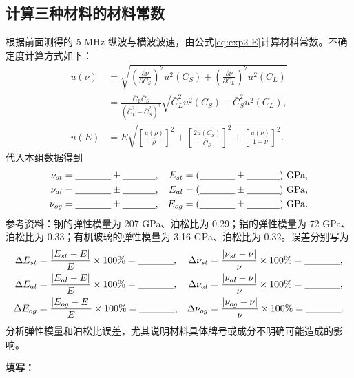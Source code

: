 \documentclass[UTF8,a4paper,12pt]{ctexart}
\newcommand{\blank}[1][2.5cm]{\mbox{\underline{\hspace{#1}}}}
\newcommand{\answer}{\par\noindent\textbf{填写：}\blank[0.86\textwidth]\par}
\numberwithin{equation}{section}
\begin{document}
\subsection{计算三种材料的材料常数}
根据前面测得的 5 MHz 纵波与横波波速，由公式\eqref{eq:exp2-E}计算材料常数。不确定度计算方式如下：
\begin{subequations}
\begin{align}
  u(\nu)&=\sqrt{\left(\frac{\partial\nu}{\partial C_S}\right)^2u^2(C_S)+
  \left(\frac{\partial\nu}{\partial C_L}\right)^2u^2(C_L)}\nonumber\\
  &=\frac{\bar{C}_L\bar{C}_S}{(\bar{C}_L^2-\bar{C}_S^2)^2}
  \sqrt{\bar{C}_L^2u^2(C_S)+\bar{C}_S^2u^2(C_L)},\\
  u(E)&=E\sqrt{\left[\frac{u(\rho)}{\bar{\rho}}\right]^2+
  \left[\frac{2u(C_S)}{\bar{C}_S}\right]^2+
  \left[\frac{u(\nu)}{1+\nu}\right]^2}.
\end{align}
\end{subequations}
代入本组数据得到
\begin{subequations}
\begin{align}
  \nu_{st}&=\blank[1.3cm]\pm\blank[1.2cm], &
  E_{st}&=(\blank[1.3cm]\pm\blank[1.2cm])\ \mathrm{GPa},\\
  \nu_{al}&=\blank[1.3cm]\pm\blank[1.2cm], &
  E_{al}&=(\blank[1.3cm]\pm\blank[1.2cm])\ \mathrm{GPa},\\
  \nu_{og}&=\blank[1.3cm]\pm\blank[1.2cm], &
  E_{og}&=(\blank[1.3cm]\pm\blank[1.2cm])\ \mathrm{GPa}.
\end{align}
\end{subequations}
参考资料：钢的弹性模量为 207 GPa、泊松比为 0.29；铝的弹性模量为 72 GPa、泊松比为 0.33；有机玻璃的弹性模量为 3.16 GPa、泊松比为 0.32。误差分别写为
\begin{subequations}
\begin{align}
  \Delta E_{st}&=\frac{|E_{st}-E|}{E}\times100\%=\blank[1.3cm], &
  \Delta\nu_{st}&=\frac{|\nu_{st}-\nu|}{\nu}\times100\%=\blank[1.3cm],\\
  \Delta E_{al}&=\frac{|E_{al}-E|}{E}\times100\%=\blank[1.3cm], &
  \Delta\nu_{al}&=\frac{|\nu_{al}-\nu|}{\nu}\times100\%=\blank[1.3cm],\\
  \Delta E_{og}&=\frac{|E_{og}-E|}{E}\times100\%=\blank[1.3cm], &
  \Delta\nu_{og}&=\frac{|\nu_{og}-\nu|}{\nu}\times100\%=\blank[1.3cm].
\end{align}
\end{subequations}
分析弹性模量和泊松比误差，尤其说明材料具体牌号或成分不明确可能造成的影响。
\answer
\end{document}

